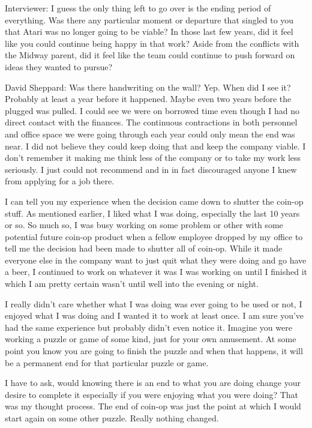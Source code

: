 \textcolor{interviewer}{Interviewer:} I guess the only thing left to go over is the ending period of everything. Was there any particular moment or departure that singled to you that Atari was no longer going to be viable? In those last few years, did it feel like you could continue being happy in that work? Aside from the conflicts with the Midway parent, did it feel like the team could continue to push forward on ideas they wanted to pursue?

David Sheppard: Was there handwriting on the wall? Yep. When did I see it? Probably at least a year before it happened. Maybe even two years before the plugged was pulled. I could see we were on borrowed time even though I had no direct contact with the finances. The continuous contractions in both personnel and office space we were going through each year could only mean the end was near. I did not believe they could keep doing that and keep the company viable. I don't remember it making me think less of the company or to take my work less seriously. I just could not recommend and in in fact discouraged anyone I knew from applying for a job there.

I can tell you my experience when the decision came down to shutter the coin-op stuff. As mentioned earlier, I liked what I was doing, especially the last 10 years or so. So much so, I was busy working on some problem or other with some potential future coin-op product when a fellow employee dropped by my office to tell me the decision had been made to shutter all of coin-op. While it made everyone else in the company want to just quit what they were doing and go have a beer, I continued to work on whatever it was I was working on until I finished it which I am pretty certain wasn't until well into the evening or night. 

I really didn't care whether what I was doing was ever going to be used or not, I enjoyed what I was doing and I wanted it to work at least once. I am sure you've had the same experience but probably didn't even notice it. Imagine you were working a puzzle or game of some kind, just for your own amusement. At some point you know you are going to finish the puzzle and when that happens, it will be a permanent end for that particular puzzle or game. 

I have to ask, would knowing there is an end to what you are doing change your desire to complete it especially if you were enjoying what you were doing? That was my thought process. The end of coin-op was just the point at which I would start again on some other puzzle. Really nothing changed.

